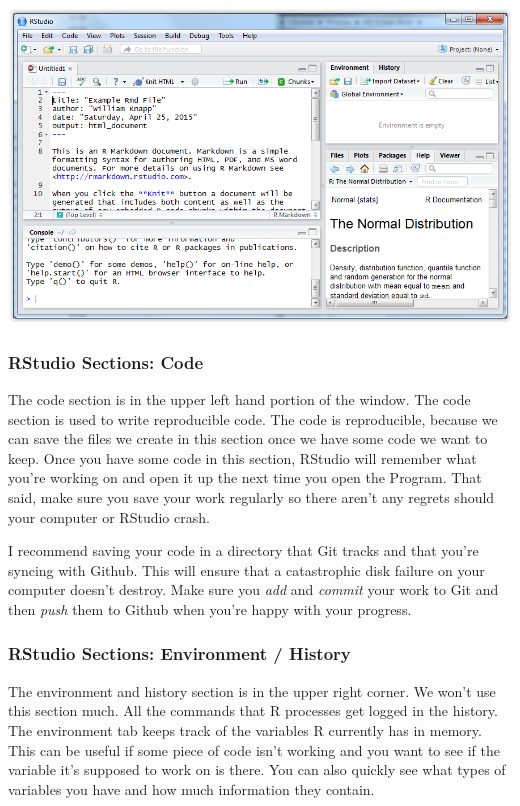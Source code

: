 \documentclass[12pt]{article}
\begin{document}
\includegraphics{imgs/R04.PNG}

\subsubsection{RStudio Sections: Code}
The code section is in the upper left hand portion of the window. The code section
is used to write reproducible code. The code is reproducible, because we can save
the files we create in this section once we have some code we want to keep. Once
you have some code in this section, RStudio will remember what you're working on
and open it up the next time you open the Program. That said, make sure you save
your work regularly so there aren't any regrets should your computer or RStudio
crash.

I recommend saving your code in a directory that Git tracks and that you're syncing
with Github. This will ensure that a catastrophic disk failure on your computer
doesn't destroy. Make sure you \emph{add} and \emph{commit} your work to Git and then 
\emph{push} them to Github when you're happy with your progress.

\subsubsection{RStudio Sections: Environment / History}
The environment and history section is in the upper right corner. We won't use this
section much. All the commands that R processes get logged in the history. The
environment tab keeps track of the variables R currently has in memory. This can
be useful if some piece of code isn't working and you want to see if the variable
it's supposed to work on is there. You can also quickly see what types of variables
you have and how much information they contain.
\end{document}
